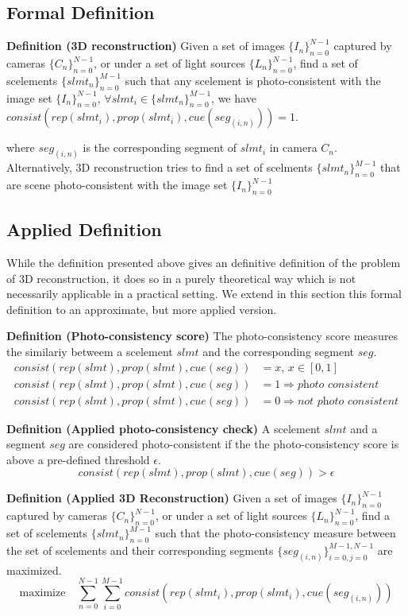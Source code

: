 \subsection{Formal Definition}
\textbf{Definition (3D reconstruction)} Given a set of images $\{I_n\}_{n=0}^{N-1}$ captured by cameras $\{C_n\}_{n=0}^{N-1}$, or under a set of light sources $\{L_n\}_{n=0}^{N-1}$, find a set of scelements $\{slmt_n\}_{n=0}^{M-1}$ such that any scelement is photo-consistent with the image set $\{I_n\}_{n=0}^{N-1}$, \ie $\forall slmt_i\in \{slmt_n\}_{n=0}^{M-1}$, we have $consist(rep(slmt_i), prop(slmt_i), cue(seg_{(i, n)})) = 1$.

where $seg_{(i, n)}$ is the corresponding segment of $slmt_i$ in camera $C_n$. Alternatively, 3D reconstruction tries to find a set of scelments $\{slmt_n\}_{n=0}^{M-1}$ that are scene photo-consistent with the image set $\{I_n\}_{n=0}^{N-1}$

\subsection{Applied Definition}
While the definition presented above gives an definitive definition of the problem of 3D reconstruction, it does so in a purely theoretical way which is not necessarily applicable in a practical setting. We extend in this section this formal definition to an approximate, but more applied version.

\textbf{Definition (Photo-consistency score)} The photo-consistency score measures the similariy betweem a scelement $slmt$ and the corresponding segment $seg$.
\begin{align*}
consist(rep(slmt), prop(slmt), cue(seg)) &= x \text{, } x\in[0, 1]\\
consist(rep(slmt), prop(slmt), cue(seg)) &= 1 \Rightarrow \textit{photo consistent}\\
consist(rep(slmt), prop(slmt), cue(seg)) &= 0 \Rightarrow \textit{not photo consistent}
\end{align*}

\textbf{Definition (Applied photo-consistency check)} A scelement $slmt$ and a segment $seg$ are considered photo-consistent if the the photo-consistency score is above a pre-defined threshold $\epsilon$.
$$
consist(rep(slmt), prop(slmt), cue(seg)) > \epsilon
$$

\textbf{Definition (Applied 3D Reconstruction)} Given a set of images $\{I_n\}_{n=0}^{N-1}$ captured by cameras $\{C_n\}_{n=0}^{N-1}$, or under a set of light sources $\{L_n\}_{n=0}^{N-1}$, find a set of scelements $\{slmt_n\}_{n=0}^{M-1}$ such that the photo-consistency measure between the set of scelements and their corresponding segments $\{seg_{(i, n)}\}_{i=0,j=0}^{M-1,N-1}$ are maximized.
$$
\mbox{maximize} \quad \sum_{n=0}^{N-1}\sum_{i=0}^{M-1} consist(rep(slmt_i), prop(slmt_i), cue(seg_{(i, n)}))
$$

